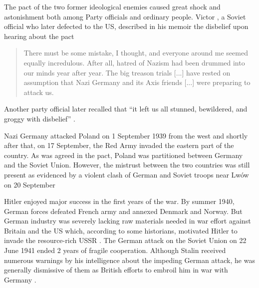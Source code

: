 


The pact of the two former ideological enemies caused great shock and astonishment both among Party officials and ordinary people. 
Victor  \citet[p. 332]{kravchenko_i_1947}, a Soviet official who later defected to the US,   described in  his memoir the disbelief upon hearing about the pact  
\begin{quote}
There must be some mistake, I thought, and everyone around me seemed equally incredulous. After all, hatred of Nazism had been drummed into our minds year after year.  The big treason trials [...] have rested on assumption that Nazi Germany and its Axis friends [...]  were preparing to attack us. 
\end{quote}
Another party official later recalled that \enquote{it left us all stunned, bewildered, and groggy with disbelief} \citep[p. 137]{robinson_black_1988}. 

Nazi Germany attacked Poland on 1 September 1939 from the west and shortly after that, on 17 September, the Red Army invaded the eastern part of the country.  As was agreed in the pact, Poland was partitioned between Germany and the Soviet Union.
However, the mistrust between the two countries was still present as evidenced by a violent clash of German and Soviet troops near Lwów on 20 September \citep[p. 685]{kotkin_stalin:_2017}

Hitler enjoyed major success in the first years of the war.
By summer 1940, German forces defeated French army and annexed Denmark and Norway. But German industry was severely lacking raw materials needed in war effort against Britain and the US which, according to some historians, motivated Hitler to invade the resource-rich USSR \citep{tooze_wages_2008}. The German attack on the Soviet Union on 22 June 1941 ended 2 years of fragile cooperation.
Although Stalin received numerous warnings by his intelligence about the impeding German attack, he was generally dismissive of them as British efforts to embroil him in war with Germany  \citep[chapter 14]{kotkin_stalin:_2017}. 

